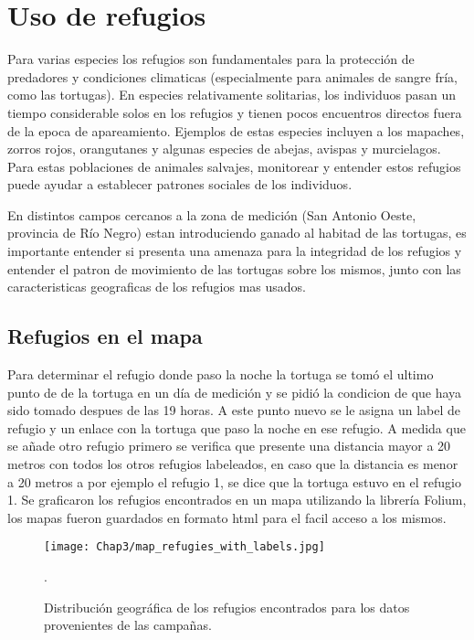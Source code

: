 \chapter{Uso de refugios}
Para varias especies los refugios son fundamentales para la protección de predadores y  condiciones climaticas (especialmente para animales de sangre fría, como las tortugas). En especies relativamente solitarias, los individuos pasan un tiempo considerable solos en los refugios y tienen pocos encuentros directos fuera de la epoca de apareamiento. %
Ejemplos de estas especies incluyen a los mapaches, zorros rojos, orangutanes y algunas especies de abejas, avispas y murcielagos. Para estas poblaciones de animales salvajes, monitorear y entender estos refugios puede ayudar a establecer patrones sociales de los individuos. 

En distintos campos cercanos a la zona de medición (San Antonio Oeste, provincia de Río Negro) estan introduciendo ganado al habitad de las tortugas, es importante entender si presenta una amenaza para la integridad de los refugios y entender el patron de movimiento  de las tortugas sobre los mismos, junto con las caracteristicas geograficas de los refugios mas usados.

\section{Refugios en el mapa}
Para determinar el refugio donde paso la noche la tortuga se tomó el ultimo punto de  de la tortuga en un día de medición y se pidió la condicion de que haya sido tomado despues de las 19 horas. A este punto nuevo se le asigna un label de refugio y un enlace con la tortuga que paso la noche en ese refugio. A medida que se añade otro refugio primero se verifica que presente una distancia mayor a 20 metros con todos los otros refugios labeleados, en caso que la distancia es menor a 20 metros a por ejemplo el refugio 1, se dice que la tortuga estuvo en el refugio 1. Se graficaron los refugios encontrados en un mapa utilizando la librería Folium, los mapas fueron guardados en formato html para el facil acceso a los mismos.
\begin{figure}[ht]
    \begin{center}
        \texttt{[image: Chap3/map\_refugies\_with\_labels.jpg]}
        \caption{Distribución geográfica de los refugios encontrados para los datos provenientes de las campañas.} 
        \label{fig:refus_campanas_con_labels}.
        
        \end{center}
\end{figure} 

